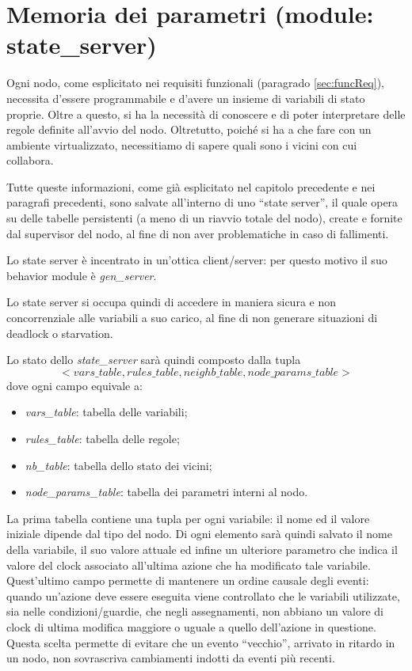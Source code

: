 \documentclass[italian]{memoir}
\begin{document}
\section{Memoria dei parametri (module: state\_server)}
Ogni nodo, come esplicitato nei requisiti funzionali (paragrado \ref{sec:funcReq}), necessita d'essere programmabile e d'avere un insieme di variabili di stato proprie. Oltre a questo, si ha la necessità di conoscere e di poter interpretare delle regole definite all'avvio del nodo. Oltretutto, poiché si ha a che fare con un ambiente virtualizzato, necessitiamo di sapere quali sono i vicini con cui collabora.

Tutte queste informazioni, come già esplicitato nel capitolo precedente e nei paragrafi precedenti, sono salvate all'interno di uno ``state server'', il quale opera su delle tabelle persistenti (a meno di un riavvio totale del nodo), create e fornite dal supervisor del nodo, al fine di non aver problematiche in caso di fallimenti.

Lo state server è incentrato in un'ottica client/server: per questo motivo il suo behavior module è \textit{gen\_server}.

Lo state server si occupa quindi di accedere in maniera sicura e non concorrenziale alle variabili a suo carico, al fine di non generare situazioni di deadlock o starvation.

Lo stato dello \textit{state\_server} sarà quindi composto dalla tupla
$$
    <vars\_table, rules\_table, neighb\_table, node\_params\_table>
$$
dove ogni campo equivale a:
\begin{itemize}
    \item \textit{vars\_table}: tabella delle variabili;
    \item \textit{rules\_table}: tabella delle regole;
    \item \textit{nb\_table}: tabella dello stato dei vicini;
    \item \textit{node\_params\_table}: tabella dei parametri interni al nodo.
\end{itemize}

La prima tabella contiene una tupla per ogni variabile: il nome ed il valore iniziale dipende dal tipo del nodo. Di ogni elemento sarà quindi salvato il nome della variabile, il suo valore attuale ed infine un ulteriore parametro che indica il valore del clock associato all'ultima azione che ha modificato tale variabile. Quest'ultimo campo permette di mantenere un ordine causale degli eventi: quando un'azione deve essere eseguita viene controllato che le variabili utilizzate, sia nelle condizioni/guardie, che negli assegnamenti, non abbiano un valore di clock di ultima modifica maggiore o uguale a quello dell'azione in questione. Questa scelta permette di evitare che un evento ``vecchio'', arrivato in ritardo in un nodo, non sovrascriva cambiamenti indotti da eventi più recenti. 
\end{document}
